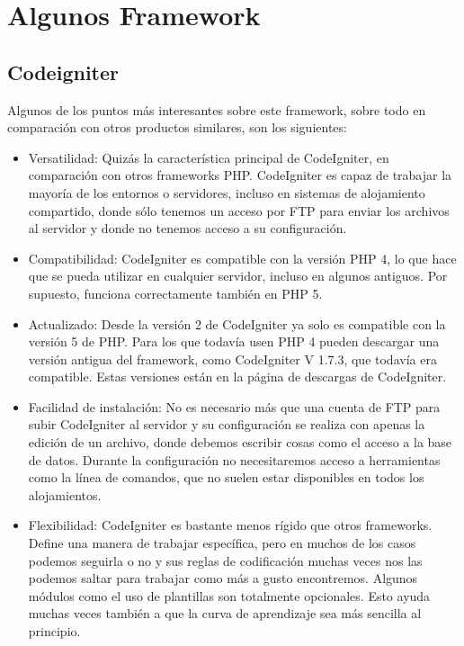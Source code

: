 
\section{Algunos Framework}

\subsection{Codeigniter}

Algunos de los puntos más interesantes sobre este framework, sobre todo en comparación con otros productos similares, son los siguientes:


\begin{itemize}

\item Versatilidad: Quizás la característica principal de CodeIgniter, en comparación con otros frameworks PHP. CodeIgniter es capaz de trabajar la mayoría de los entornos o servidores, incluso en sistemas de alojamiento compartido, donde sólo tenemos un acceso por FTP para enviar los archivos al servidor y donde no tenemos acceso a su configuración.


\item Compatibilidad: CodeIgniter es compatible con la versión PHP 4, lo que hace que se pueda utilizar en cualquier servidor, incluso en algunos antiguos. Por supuesto, funciona correctamente también en PHP 5.

\item Actualizado: Desde la versión 2 de CodeIgniter ya solo es compatible con la versión 5 de PHP. Para los que todavía usen PHP 4 pueden descargar una versión antigua del framework, como CodeIgniter V 1.7.3, que todavía era compatible. Estas versiones están en la página de descargas de CodeIgniter.

\item Facilidad de instalación: No es necesario más que una cuenta de FTP para subir CodeIgniter al servidor y su configuración se realiza con apenas la edición de un archivo, donde debemos escribir cosas como el acceso a la base de datos. Durante la configuración no necesitaremos acceso a herramientas como la línea de comandos, que no suelen estar disponibles en todos los alojamientos.

\item Flexibilidad: CodeIgniter es bastante menos rígido que otros frameworks. Define una manera de trabajar específica, pero en muchos de los casos podemos seguirla o no y sus reglas de codificación muchas veces nos las podemos saltar para trabajar como más a gusto encontremos. Algunos módulos como el uso de plantillas son totalmente opcionales. Esto ayuda muchas veces también a que la curva de aprendizaje sea más sencilla al principio.


\end{itemize}
